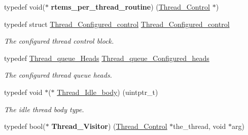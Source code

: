 \begin{DoxyCompactItemize}
\mbox{\label{group__RTEMSScoreThread_ga3c2d551ce2693b640db21f452d6436b8}} 
typedef void($\ast$ {\bfseries rtems\+\_\+per\+\_\+thread\+\_\+routine}) (\mbox{\hyperlink{struct__Thread__Control}{Thread\+\_\+\+Control}} $\ast$)
\item 
typedef struct \mbox{\hyperlink{group__RTEMSScoreThread_gadf9fc745768399b59fb0ff5e81838540}{Thread\+\_\+\+Configured\+\_\+control}} \mbox{\hyperlink{group__RTEMSScoreThread_gadf9fc745768399b59fb0ff5e81838540}{Thread\+\_\+\+Configured\+\_\+control}}
\begin{DoxyCompactList}\small\item\em The configured thread control block. \end{DoxyCompactList}\item 
typedef \mbox{\hyperlink{group__RTEMSScoreThreadQueue_gaebac32033b009cc8f606a90bd389f8e9}{Thread\+\_\+queue\+\_\+\+Heads}} \mbox{\hyperlink{group__RTEMSScoreThread_gac2edd6c043930e8159685c0cb2e19ca7}{Thread\+\_\+queue\+\_\+\+Configured\+\_\+heads}}
\begin{DoxyCompactList}\small\item\em The configured thread queue heads. \end{DoxyCompactList}\item 
\mbox{\label{group__RTEMSScoreThread_ga45e6fd0b5cd35ee2ea9e36be90a84c1b}} 
typedef void $\ast$($\ast$ \mbox{\hyperlink{group__RTEMSScoreThread_ga45e6fd0b5cd35ee2ea9e36be90a84c1b}{Thread\+\_\+\+Idle\+\_\+body}}) (uintptr\+\_\+t)
\begin{DoxyCompactList}\small\item\em The idle thread body type. \end{DoxyCompactList}\item 
\mbox{\label{group__RTEMSScoreThread_ga132f6ea936a5073b50fa88f6a46805bc}} 
typedef bool($\ast$ {\bfseries Thread\+\_\+\+Visitor}) (\mbox{\hyperlink{struct__Thread__Control}{Thread\+\_\+\+Control}} $\ast$the\+\_\+thread, void $\ast$arg)
\end{DoxyCompactItemize}
